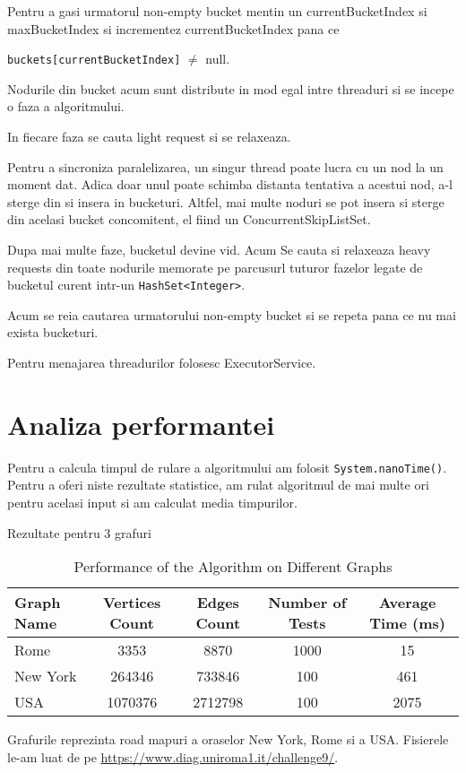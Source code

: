 \documentclass{llncs}
\begin{document}
Pentru a gasi urmatorul non-empty bucket mentin un currentBucketIndex si maxBucketIndex si incrementez currentBucketIndex pana ce 

\texttt{buckets[currentBucketIndex]} $\neq$ null.

Nodurile din bucket acum sunt distribute in mod egal intre threaduri si se incepe o faza a algoritmului.

In fiecare faza se cauta light request si se relaxeaza.

Pentru a sincroniza paralelizarea, un singur thread poate lucra cu un nod la un moment dat. Adica doar unul poate schimba distanta tentativa a acestui nod, a-l sterge din si insera in bucketuri. Altfel, mai multe noduri se pot insera si sterge din acelasi bucket concomitent, el fiind un ConcurrentSkipListSet.

Dupa mai multe faze, bucketul devine vid. Acum Se cauta si relaxeaza heavy requests din toate nodurile memorate pe parcusurl tuturor fazelor legate de bucketul curent intr-un \texttt{HashSet<Integer>}. 

Acum se reia cautarea urmatorului non-empty bucket si se repeta pana ce nu mai exista bucketuri.

Pentru menajarea threadurilor folosesc ExecutorService.


\newpage
\section{Analiza performantei} 

Pentru a calcula timpul de rulare a algoritmului am folosit \texttt{System.nanoTime()}. Pentru a oferi niste rezultate statistice, am rulat algoritmul de mai multe ori pentru acelasi input si am calculat media timpurilor.

Rezultate pentru 3 grafuri 

\begin{table}[h]
\centering
\begin{tabular}{|l|c|c|c|c|}
\hline
\textbf{Graph Name} & \textbf{Vertices Count} & \textbf{Edges Count} & \textbf{Number of Tests} & \textbf{Average Time (ms)} \\ \hline
Rome & 3353 & 8870 & 1000 & 15 \\ \hline
New York & 264346 & 733846 & 100 &461 \\ \hline
USA & 1070376 & 2712798 & 100 & 2075 \\ \hline 
\end{tabular}
\caption{Performance of the Algorithm on Different Graphs}
\label{tab:performance}
\end{table}

Grafurile reprezinta road mapuri a oraselor New York, Rome si a USA. Fisierele le-am luat de pe \href{https://www.diag.uniroma1.it/challenge9/}{https://www.diag.uniroma1.it/challenge9/}.
\end{document}
